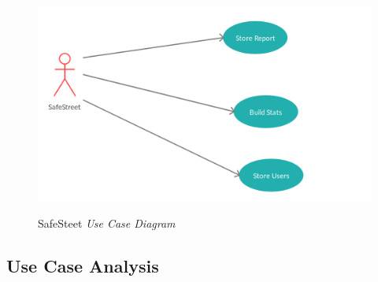 \documentclass[../RASD.tex]{subfiles}
\begin{document}
                    \begin{figure}[H]
                        \centering
                        \includegraphics[scale = 1]{assets/safeStreetUC.png}\\[1.6 cm]
                        \caption[SafeStreet \textit{Use Case Diagram}]{SafeSteet \textit{Use Case Diagram}}
                    \end{figure}
                    \newpage
            \subsection{Use Case Analysis}\label{subsec:use-case-analysis}
                
            \newpage
\end{document}
